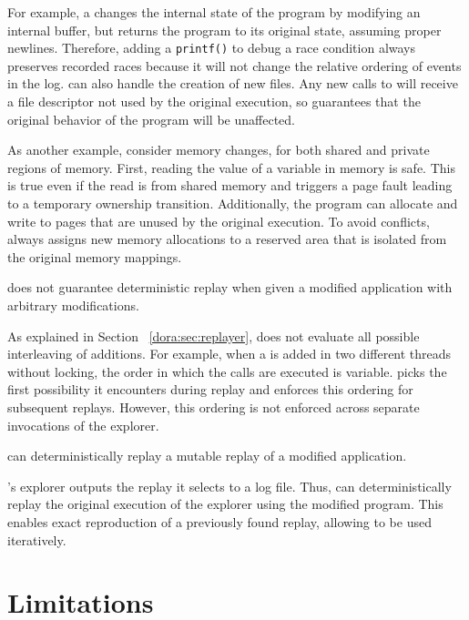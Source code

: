 	For example, a  changes the internal state
	of the program by modifying an internal buffer, but returns the program to
	its original state, assuming proper newlines. Therefore, adding a {\tt printf()} to
	debug a race condition always preserves recorded races because
	it will not change the relative ordering of events in the
	log. {\dora} can also handle the creation of new files. Any new calls to
	 will receive a file descriptor not used by the original execution,
	so {\dora} guarantees that the original behavior of the program will be
	unaffected.

	As another example, consider memory changes, for both shared and private
	regions of memory. First, reading the value of a variable in memory is safe.
	This is true even if the read is from shared memory and triggers a page fault
	leading to a temporary ownership transition. Additionally, the program can
	allocate and write to pages that are unused by the original
	execution. To avoid conflicts, {\dora} always assigns new memory
	allocations to a reserved area that is isolated from the original memory mappings.

\begin{property}
	{\dora} does not guarantee deterministic replay when given a modified application
	with arbitrary modifications.
\end{property}
	As explained in Section ~\ref{dora:sec:replayer}, {\dora} does not evaluate
	all possible interleaving of additions.
	For example, when a  is added in two different
	threads without locking, the order in which the calls are executed is
	variable. {\dora}
	picks the first possibility it encounters during replay and enforces this
	ordering for subsequent replays. However, this ordering is not enforced
	across separate invocations of the explorer.

\begin{property}
	{\dora} can deterministically replay a mutable replay of a
	modified application.
\end{property}
	{\dora}'s explorer outputs the replay it selects to a log file. Thus, {\dora} can
	deterministically replay the original execution of the explorer using the
	modified program. This enables exact reproduction of a previously found
	replay, allowing {\dora} to be used iteratively.
\section{Limitations}
\label{dora:sec:limitations}


